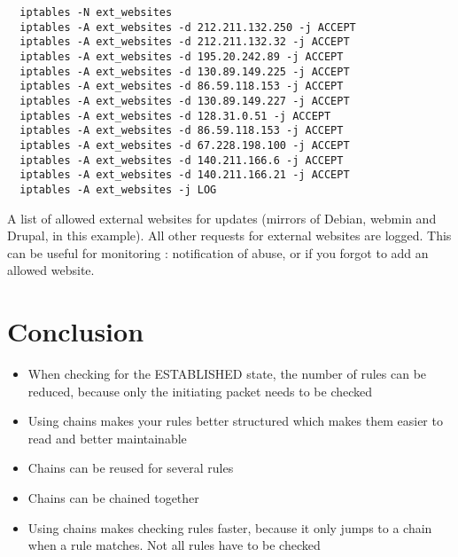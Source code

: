 \documentclass[a4paper,12pt]{article}
\begin{document}
\begin{verbatim}
  iptables -N ext_websites
  iptables -A ext_websites -d 212.211.132.250 -j ACCEPT
  iptables -A ext_websites -d 212.211.132.32 -j ACCEPT
  iptables -A ext_websites -d 195.20.242.89 -j ACCEPT
  iptables -A ext_websites -d 130.89.149.225 -j ACCEPT
  iptables -A ext_websites -d 86.59.118.153 -j ACCEPT
  iptables -A ext_websites -d 130.89.149.227 -j ACCEPT
  iptables -A ext_websites -d 128.31.0.51 -j ACCEPT
  iptables -A ext_websites -d 86.59.118.153 -j ACCEPT
  iptables -A ext_websites -d 67.228.198.100 -j ACCEPT
  iptables -A ext_websites -d 140.211.166.6 -j ACCEPT
  iptables -A ext_websites -d 140.211.166.21 -j ACCEPT
  iptables -A ext_websites -j LOG
\end{verbatim}

A list of allowed external websites for updates (mirrors of Debian, webmin and Drupal, in this example).
All other requests for external websites are logged. This can be useful for monitoring : notification of abuse, or if you forgot to add an allowed website.

\section{Conclusion}
\begin{itemize}
  \item When checking for the ESTABLISHED state, the number of rules can be reduced, because only the initiating packet needs to be checked
  \item Using chains makes your rules better structured which makes them easier to read and better maintainable
  \item Chains can be reused for several rules
  \item Chains can be chained together
  \item Using chains makes checking rules faster, because it only jumps to a chain when a rule matches. Not all rules have to be checked
\end{itemize}
\end{document}
